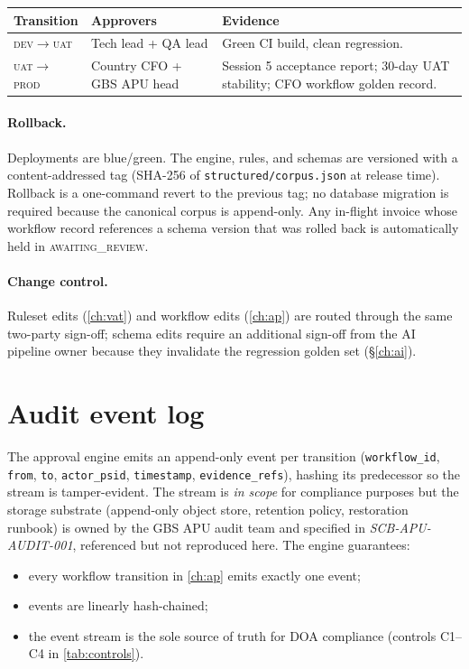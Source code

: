 \documentclass[11pt,a4paper,twoside]{report}
\begin{document}
\begin{tabularx}{\linewidth}{@{}l l X@{}}
\toprule
\textbf{Transition} & \textbf{Approvers} & \textbf{Evidence} \\ \midrule
\textsc{dev}$\to$\textsc{uat}  & Tech lead + QA lead           & Green CI build, clean regression. \\
\textsc{uat}$\to$\textsc{prod} & Country CFO + GBS APU head    & Session 5 acceptance report; 30-day UAT stability; CFO workflow golden record. \\
\bottomrule
\end{tabularx}

\paragraph{Rollback.} Deployments are blue/green. The engine, rules,
and schemas are versioned with a content-addressed tag (SHA-256 of
\texttt{structured/corpus.json} at release time). Rollback is a
one-command revert to the previous tag; no database migration is
required because the canonical corpus is append-only. Any in-flight
invoice whose workflow record references a schema version that was
rolled back is automatically held in \textsc{awaiting\_review}.

\paragraph{Change control.} Ruleset edits (\cref{ch:vat}) and
workflow edits (\cref{ch:ap}) are routed through the same two-party
sign-off; schema edits require an additional sign-off from the AI
pipeline owner because they invalidate the regression golden set
(\S\ref{ch:ai}).

\section{Audit event log}

The approval engine emits an append-only event per transition
(\texttt{workflow\_id}, \texttt{from}, \texttt{to},
\texttt{actor\_psid}, \texttt{timestamp}, \texttt{evidence\_refs}),
hashing its predecessor so the stream is tamper-evident. The stream
is \emph{in scope} for compliance purposes but the storage substrate
(append-only object store, retention policy, restoration runbook) is
owned by the GBS APU audit team and specified in
\emph{SCB-APU-AUDIT-001}, referenced but not reproduced here. The
engine guarantees:

\begin{itemize}
  \item every workflow transition in \cref{ch:ap} emits exactly one
        event;
  \item events are linearly hash-chained;
  \item the event stream is the sole source of truth for DOA
        compliance (controls C1--C4 in \cref{tab:controls}).
\end{itemize}
\end{document}

